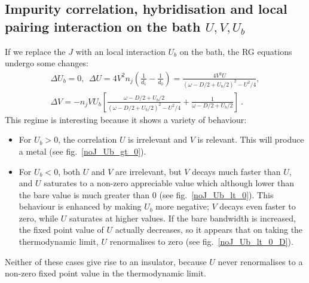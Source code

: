 \documentclass{report}
\numberwithin{equation}{section}
\begin{document}
\subsection{Impurity correlation, hybridisation and local pairing interaction on the bath \(U,V,U_b\)}
If we replace the \(J\) with an local interaction \(U_b\) on the bath, the RG equations undergo some changes:
\begin{gather}
	\Delta U_b = 0, ~ ~\Delta U = 4V^2 n_j\left(\frac{1}{d_1} - \frac{1}{d_0}\right) = \frac{4V^2U}{\left(\omega - D/2 + U_b/2\right)^2 - U^2/4},\\
	\Delta V = -n_j V U_b\left[\frac{\omega - D/2 + U_b/2}{\left(\omega - D/2 + U_b/2\right)^2 - U^2/4} + \frac{1}{\omega - D/2 + U_b/2}\right]~.
\end{gather}
This regime is interesting because it shows a variety of behaviour:
\begin{itemize}
	\item For \(U_b>0\), the correlation \(U\) is irrelevant and \(V\) is relevant. This will produce a metal (see fig.~\ref{noJ_Ub_gt_0}).
	\item For \(U_b<0\), both \(U\) and \(V\) are irrelevant, but \(V\) decays much faster than \(U\), and \(U\) saturates to a non-zero appreciable value which although lower than the bare value is much greater than 0 (see fig.~\ref{noJ_Ub_lt_0}). This behaviour is enhanced by making \(U_b\) more negative; \(V\) decays even faster to zero, while \(U\) saturates at higher values. If the bare bandwidth is increased, the fixed point value of \(U\) actually decreases, so it appears that on taking the thermodynamic limit, \(U\) renormalises to zero (see fig.~\ref{noJ_Ub_lt_0_D}).
\end{itemize}

Neither of these cases give rise to an insulator, because \(U\) never renormalises to a non-zero fixed point value in the thermodynamic limit.
\end{document}
